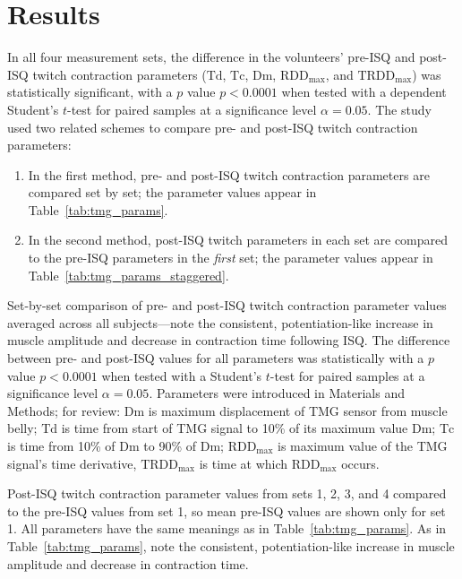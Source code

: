 \documentclass[utf8]{style/FrontiersinHarvard}
\newcommand{\Dm}{\ensuremath{\text{Dm}}\xspace}
\newcommand{\Td}{\ensuremath{\text{Td}}\xspace}
\newcommand{\Tc}{\ensuremath{\text{Tc}}\xspace}
\newcommand{\RDDMax}{\ensuremath{ \text{RDD}_{\text{max}}}\xspace}
\newcommand{\RDDMaxTime}{\ensuremath{ \text{TRDD}_{\text{max}}}\xspace}
\begin{document}
\section{Results}
In all four measurement sets, the difference in the volunteers' pre-ISQ and post-ISQ twitch contraction parameters 
(\Td, \Tc, \Dm, \RDDMax, and \RDDMaxTime)
was statistically significant, with a $ p $ value $ p < 0.0001 $ when tested with a dependent Student's $ t $-test for paired samples at a significance level $ \alpha = 0.05 $.
The study used two related schemes to compare pre- and post-ISQ twitch contraction parameters:
\begin{enumerate}

    \item In the first method, pre- and post-ISQ twitch contraction parameters are compared set by set;
    the parameter values appear in Table~\ref{tab:tmg_params}.

    \item In the second method, post-ISQ twitch parameters in each set are compared to the pre-ISQ parameters in the \textit{first} set;
    the parameter values appear in Table~\ref{tab:tmg_params_staggered}.

\end{enumerate}

\begin{table}[htb!]
    \centering
    \caption{Set-by-set comparison of pre- and post-ISQ twitch contraction parameter values averaged across all subjects---note the consistent, potentiation-like increase in muscle amplitude and decrease in contraction time following ISQ.
    The difference between pre- and post-ISQ values for all parameters was statistically with a $ p $ value $ p < 0.0001 $ when tested with a Student's $ t $-test for paired samples at a significance level $ \alpha = 0.05 $.
    Parameters were introduced in Materials and Methods; for review:
    \Dm is maximum displacement of TMG sensor from muscle belly;
    \Td is time from start of TMG signal to 10\% of its maximum value \Dm;
    \Tc is time from 10\% of \Dm to 90\% of \Dm;
    \RDDMax is maximum value of the TMG signal's time derivative,
    \RDDMaxTime is time at which \RDDMax occurs.
    }
    \vspace{1ex}

    \renewcommand{\arraystretch}{1.2}
    
    \label{tab:tmg_params}
\end{table}

\begin{table}[htb!]
    \centering
    \caption{Post-ISQ twitch contraction parameter values from sets 1, 2, 3, and 4 compared to the pre-ISQ values from set 1,
    so mean pre-ISQ values are shown only for set 1.
    All parameters have the same meanings as in Table~\ref{tab:tmg_params}.
    As in Table~\ref{tab:tmg_params}, note the consistent, potentiation-like increase in muscle amplitude and decrease in contraction time.
    }
    \vspace{1ex}

    \renewcommand{\arraystretch}{1.2}
    
    \label{tab:tmg_params_staggered}
\end{table}
\end{document}
